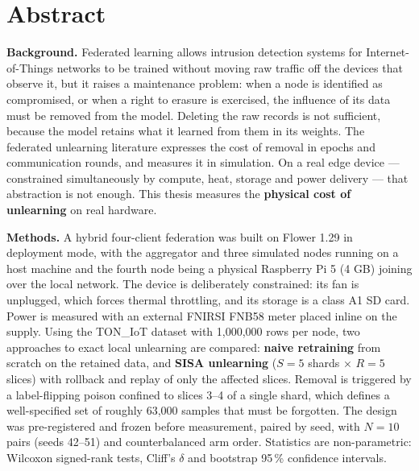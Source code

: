 \chapter*{Abstract}

\textbf{Background.} Federated learning allows intrusion detection systems for Internet-of-Things
networks to be trained without moving raw traffic off the devices that observe it, but it
raises a maintenance problem: when a node is identified as compromised, or when a right to
erasure is exercised, the influence of its data must be removed from the model. Deleting the
raw records is not sufficient, because the model retains what it learned from them in its
weights. The federated unlearning literature expresses the cost of removal in epochs and
communication rounds, and measures it in simulation. On a real edge device --- constrained
simultaneously by compute, heat, storage and power delivery --- that abstraction is not
enough. This thesis measures the \textbf{physical cost of unlearning} on real hardware.

\textbf{Methods.} A hybrid four-client federation was built on Flower 1.29 in deployment mode,
with the aggregator and three simulated nodes running on a host machine and the fourth node
being a physical Raspberry Pi 5 (4 GB) joining over the local network. The device is
deliberately constrained: its fan is unplugged, which forces thermal throttling, and its
storage is a class A1 SD card. Power is measured with an external FNIRSI FNB58 meter placed
inline on the supply. Using the TON\_IoT dataset with 1,000,000 rows per node, two approaches
to exact local unlearning are compared: \textbf{naive retraining} from scratch on the retained
data, and \textbf{SISA unlearning} ($S = 5$ shards × $R = 5$ slices) with rollback and replay of
only the affected slices. Removal is triggered by a label-flipping poison confined to slices
3–4 of a single shard, which defines a well-specified set of roughly 63,000 samples that must
be forgotten. The design was pre-registered and frozen before measurement, paired by seed,
with $N = 10$ pairs (seeds 42–51) and counterbalanced arm order. Statistics are
non-parametric: Wilcoxon signed-rank tests, Cliff's $\delta$ and bootstrap 95\,\% confidence
intervals.

